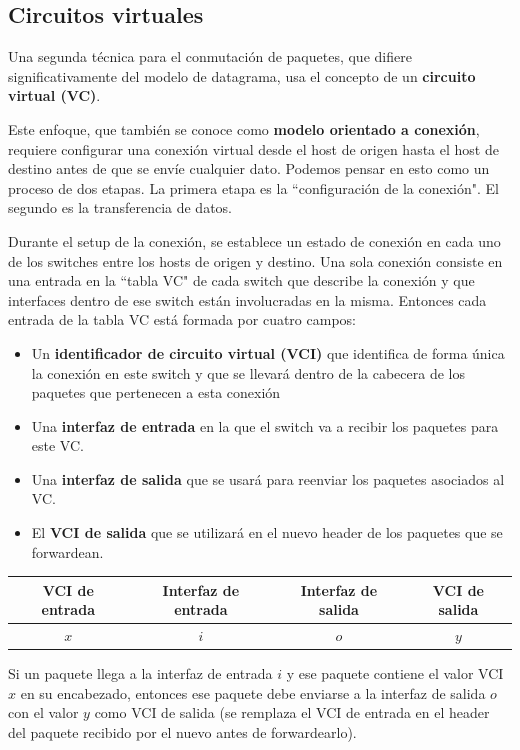 \subsection{Circuitos virtuales}
Una segunda técnica para el conmutación de paquetes, que difiere significativamente del modelo de datagrama, usa el concepto de un \textbf{circuito virtual (VC)}.

Este enfoque, que también se conoce como \textbf{modelo orientado a conexión}, requiere configurar una conexión virtual desde el host de origen hasta el host de destino antes de que se envíe cualquier dato. Podemos pensar en esto como un proceso de dos etapas. La primera etapa es la ``configuración de la conexión". El segundo es la transferencia de datos.

Durante el setup de la conexión, se establece un estado de conexión en cada uno de los switches entre los hosts de origen y destino. Una sola conexión consiste en una entrada en la ``tabla VC" de cada switch que describe la conexión y que interfaces dentro de ese switch están involucradas en la misma. Entonces cada entrada de la tabla VC está formada por cuatro campos:

\begin{itemize}
  \item Un \textbf{identificador de circuito virtual (VCI)} que identifica de forma única la conexión en este switch y que se llevará dentro de la cabecera de los paquetes que pertenecen a esta conexión
  \item Una \textbf{interfaz de entrada} en la que el switch va a recibir los paquetes para este VC.
  \item Una \textbf{interfaz de salida} que se usará para reenviar los paquetes asociados al VC.
  \item El \textbf{VCI de salida} que se utilizará en el nuevo header de los paquetes que se forwardean.
 \end{itemize}

 \begin{center}
  \begin{tabular}{|c|c|c|c|}
    \hline
    \textbf{VCI de entrada} & \textbf{Interfaz de entrada} & \textbf{Interfaz de salida} & \textbf{VCI de salida} \\ \hline
    \(x\) & \(i\) & \(o\) & \(y\) \\ \hline
  \end{tabular}
 \end{center}

 Si un paquete llega a la interfaz de entrada \(i\) y ese paquete contiene el valor VCI \(x\) en su encabezado, entonces ese paquete debe enviarse a la interfaz de salida \(o\) con el valor \(y\) como VCI de salida (se remplaza el VCI de entrada en el header del paquete recibido por el nuevo antes de forwardearlo).

